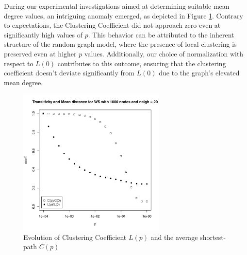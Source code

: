 During our experimental investigations aimed at determining suitable mean degree values, an intriguing anomaly emerged, as depicted in Figure \ref{fig:ws_high_neigh}. Contrary to expectations, the Clustering Coefficient did not approach zero even at significantly high values of $p$. This behavior can be attributed to the inherent structure of the random graph model, where the presence of local clustering is preserved even at higher $p$ values. Additionally, our choice of normalization with respect to $L(0)$ contributes to this outcome, ensuring that the clustering coefficient doesn't deviate significantly from $L(0)$ due to the graph's elevated mean degree.

\begin{figure}
    \centering
    \includegraphics[width=0.66\textwidth]{figures/WS_neigh_20.pdf}
    \caption{Evolution of Clustering Coefficient $L(p)$ and the average shortest-path $C(p)$}
    \label{fig:ws_high_neigh}
\end{figure}